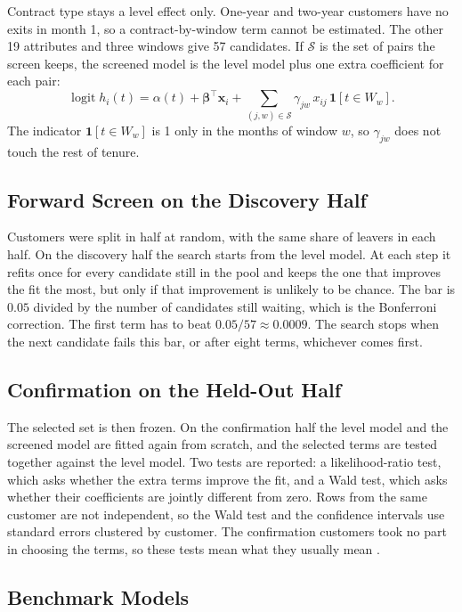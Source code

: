 \documentclass[conference]{IEEEtran}
\begin{document}
Contract type stays a level effect only. One-year and two-year customers have no exits in month 1, so a contract-by-window term cannot be estimated. The other 19 attributes and three windows give 57 candidates. If $\mathcal{S}$ is the set of pairs the screen keeps, the screened model is the level model plus one extra coefficient for each pair:
\begin{equation}
\operatorname{logit} h_i(t) = \alpha(t) + \boldsymbol{\beta}^{\top}\mathbf{x}_i + \sum_{(j,w)\in\mathcal{S}} \gamma_{jw}\, x_{ij}\,\mathbf{1}[t \in W_w].
\end{equation}
The indicator $\mathbf{1}[t \in W_w]$ is 1 only in the months of window $w$, so $\gamma_{jw}$ does not touch the rest of tenure.

\subsection{Forward Screen on the Discovery Half}

Customers were split in half at random, with the same share of leavers in each half. On the discovery half the search starts from the level model. At each step it refits once for every candidate still in the pool and keeps the one that improves the fit the most, but only if that improvement is unlikely to be chance. The bar is $0.05$ divided by the number of candidates still waiting, which is the Bonferroni correction. The first term has to beat $0.05/57 \approx 0.0009$. The search stops when the next candidate fails this bar, or after eight terms, whichever comes first.

\subsection{Confirmation on the Held-Out Half}

The selected set is then frozen. On the confirmation half the level model and the screened model are fitted again from scratch, and the selected terms are tested together against the level model. Two tests are reported: a likelihood-ratio test, which asks whether the extra terms improve the fit, and a Wald test, which asks whether their coefficients are jointly different from zero. Rows from the same customer are not independent, so the Wald test and the confidence intervals use standard errors clustered by customer. The confirmation customers took no part in choosing the terms, so these tests mean what they usually mean \cite{cox1975}.

\subsection{Benchmark Models}
\end{document}
